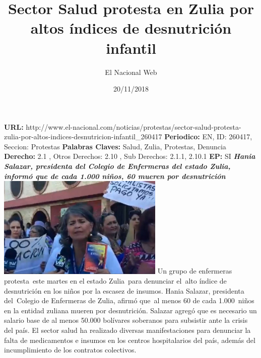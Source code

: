 \documentclass{article}%
\title{\textbf{Sector Salud protesta en Zulia por altos índices de desnutrición infantil}}%
\author{El Nacional Web}%
\date{20/11/2018}%
\begin{document}
%
\normalsize%
\maketitle%
\textbf{URL: }%
http://www.el{-}nacional.com/noticias/protestas/sector{-}salud{-}protesta{-}zulia{-}por{-}altos{-}indices{-}desnutricion{-}infantil\_260417\newline%
%
\textbf{Periodico: }%
EN, %
ID: %
260417, %
Seccion: %
Protestas\newline%
%
\textbf{Palabras Claves: }%
Salud, Zulia, Protestas, Denuncia\newline%
%
\textbf{Derecho: }%
2.1%
, Otros Derechos: %
2.10%
, Sub Derechos: %
2.1.1, 2.10.1%
\newline%
%
\textbf{EP: }%
SI\newline%
\newline%
%
\textbf{\textit{Hania Salazar, presidenta del Colegio de Enfermeras del estado Zulia, informó que de cada 1.000 niños, 60 mueren por desnutrición}}%
\newline%
\newline%
%
\includegraphics[width=300px]{71.jpg}%
\newline%
%
Un grupo de enfermeras protesta~este martes en el estado Zulia~para denunciar el~alto índice de desnutrición en los niños por la escasez de insumos.%
\newline%
%
Hania Salazar, presidenta del~Colegio de Enfermeras de Zulia, afirmó que~al menos 60 de cada 1.000~niños en la entidad zuliana mueren por desnutrición.%
\newline%
%
Salazar agregó que es necesario un salario base de al menos 50.000 bolívares soberanos para subsistir ante la crisis del país.%
\newline%
%
El sector salud ha realizado diversas manifestaciones para denunciar la falta de medicamentos e insumos en los centros hospitalarios del país, además del incumplimiento de los contratos colectivos.%
\newline%
%
\end{document}
